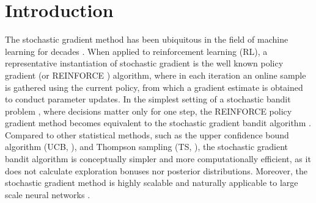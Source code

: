 \section{Introduction}

The stochastic gradient method has been ubiquitous in the field of machine learning for decades \citep{bottou2010large}. When applied to reinforcement learning (RL), a representative instantiation of stochastic gradient is the well known policy gradient \citep{sutton1999policy} (or REINFORCE \citep{williams1992simple}) algorithm, where in each iteration an online %
sample is gathered
using the current policy, from which a gradient estimate is obtained to conduct parameter updates. %
In the simplest setting of a stochastic bandit problem \citep{lattimore2020bandit}, where decisions matter only for one step, the REINFORCE policy gradient method becomes equivalent to the stochastic gradient bandit algorithm \citep[Section 2.8]{sutton2018reinforcement}. Compared to other statistical methods, such as the upper confidence bound algorithm (UCB, \citep{lai1985asymptotically, auer2002finite}), and Thompson sampling (TS, \citep{thompson1933likelihood,agrawal2012analysis}), the stochastic gradient bandit algorithm is conceptually simpler and more computationally efficient, as it does not calculate exploration bonuses nor posterior distributions. Moreover, the stochastic gradient method is highly scalable and naturally applicable to large scale neural networks \citep{schulman2015trust,schulman2017proximal}.

